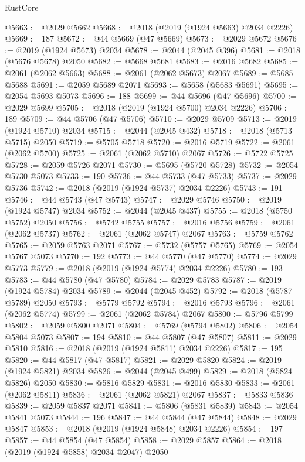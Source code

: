 \begin{lexlean}{RustCore}
\begin{coremodule}
@5663 := @2029 @5662
@5668 := @2018 (@2019 (@1924 @5663) @2034 @2226)
@5669 := 187
@5672 := @44 @5669 (@47 @5669)
@5673 := @2029 @5672
@5676 := @2019 (@1924 @5673) @2034
@5678 := @2044 (@2045 @396)
@5681 := @2018 (@5676 @5678) @2050
@5682 := @5668 @5681
@5683 := @2016 @5682
@5685 := @2061 (@2062 @5663)
@5688 := @2061 (@2062 @5673) @2067
@5689 := @5685 @5688
@5691 := @2059 @5689 @2071
@5693 := @5658 (@5683 @5691)
@5695 := @2054 @5693 @5073
@5696 := 188
@5699 := @44 @5696 (@47 @5696)
@5700 := @2029 @5699
@5705 := @2018 (@2019 (@1924 @5700) @2034 @2226)
@5706 := 189
@5709 := @44 @5706 (@47 @5706)
@5710 := @2029 @5709
@5713 := @2019 (@1924 @5710) @2034
@5715 := @2044 (@2045 @432)
@5718 := @2018 (@5713 @5715) @2050
@5719 := @5705 @5718
@5720 := @2016 @5719
@5722 := @2061 (@2062 @5700)
@5725 := @2061 (@2062 @5710) @2067
@5726 := @5722 @5725
@5728 := @2059 @5726 @2071
@5730 := @5695 (@5720 @5728)
@5732 := @2054 @5730 @5073
@5733 := 190
@5736 := @44 @5733 (@47 @5733)
@5737 := @2029 @5736
@5742 := @2018 (@2019 (@1924 @5737) @2034 @2226)
@5743 := 191
@5746 := @44 @5743 (@47 @5743)
@5747 := @2029 @5746
@5750 := @2019 (@1924 @5747) @2034
@5752 := @2044 (@2045 @437)
@5755 := @2018 (@5750 @5752) @2050
@5756 := @5742 @5755
@5757 := @2016 @5756
@5759 := @2061 (@2062 @5737)
@5762 := @2061 (@2062 @5747) @2067
@5763 := @5759 @5762
@5765 := @2059 @5763 @2071
@5767 := @5732 (@5757 @5765)
@5769 := @2054 @5767 @5073
@5770 := 192
@5773 := @44 @5770 (@47 @5770)
@5774 := @2029 @5773
@5779 := @2018 (@2019 (@1924 @5774) @2034 @2226)
@5780 := 193
@5783 := @44 @5780 (@47 @5780)
@5784 := @2029 @5783
@5787 := @2019 (@1924 @5784) @2034
@5789 := @2044 (@2045 @452)
@5792 := @2018 (@5787 @5789) @2050
@5793 := @5779 @5792
@5794 := @2016 @5793
@5796 := @2061 (@2062 @5774)
@5799 := @2061 (@2062 @5784) @2067
@5800 := @5796 @5799
@5802 := @2059 @5800 @2071
@5804 := @5769 (@5794 @5802)
@5806 := @2054 @5804 @5073
@5807 := 194
@5810 := @44 @5807 (@47 @5807)
@5811 := @2029 @5810
@5816 := @2018 (@2019 (@1924 @5811) @2034 @2226)
@5817 := 195
@5820 := @44 @5817 (@47 @5817)
@5821 := @2029 @5820
@5824 := @2019 (@1924 @5821) @2034
@5826 := @2044 (@2045 @499)
@5829 := @2018 (@5824 @5826) @2050
@5830 := @5816 @5829
@5831 := @2016 @5830
@5833 := @2061 (@2062 @5811)
@5836 := @2061 (@2062 @5821) @2067
@5837 := @5833 @5836
@5839 := @2059 @5837 @2071
@5841 := @5806 (@5831 @5839)
@5843 := @2054 @5841 @5073
@5844 := 196
@5847 := @44 @5844 (@47 @5844)
@5848 := @2029 @5847
@5853 := @2018 (@2019 (@1924 @5848) @2034 @2226)
@5854 := 197
@5857 := @44 @5854 (@47 @5854)
@5858 := @2029 @5857
@5864 := @2018 (@2019 (@1924 @5858) @2034 @2047) @2050

\end{coremodule}
\end{lexlean}

